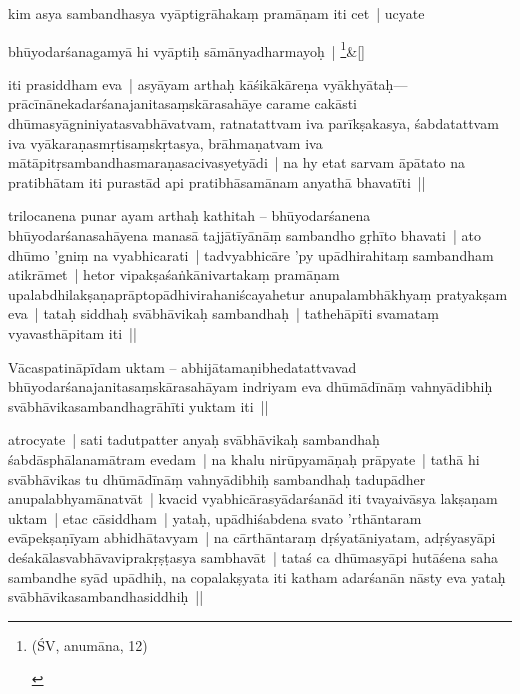 \documentclass[article,a4paper]{memoir}
\newcommand{\persName}[1]{#1}
\begin{document}
	  \pstart kim asya sambandhasya vyā\-ptigrā\-hakaṃ pramā\-ṇam iti cet | ucyate
	\pend
      
	    
	    \stanza[\smallbreak]
bhū\-yodarśanagamyā\- hi vyā\-ptiḥ sā\-mā\-nyadharmayoḥ | \footnote{\begin{english}(ŚV, anumā\-na, 12)\end{english}}\&[\smallbreak]


	

	  \pstart iti prasiddham eva | asyā\-yam arthaḥ kā\-śikā\-kā\-reṇa vyā\-khyā\-taḥ—prā\-cī\-nā\-nekadarśanajanitasaṃskā\-rasahā\-ye carame  cakā\-sti dhū\-masyā\-gniniyatasvabhā\-vatvam, ratnatattvam iva parī\-kṣakasya, śabdatattvam iva vyā\-karaṇasmṛtisaṃskṛtasya, brā\-hmaṇatvam iva mā\-tā\-pitṛsambandhasmaraṇasacivasyetyā\-di | na hy etat sarvam ā\-pā\-tato na pratibhā\-tam iti purastā\-d api pratibhā\-samā\-nam anyathā\- bhavatī\-ti ||
	\pend
      

	  \pstart \persName{trilocanena} punar ayam arthaḥ kathitah – \label{sarit__ratnakīrtinibandhāvali__125156}bhū\-yodarśanena bhū\-yodarśanasahā\-yena manasā\- tajjā\-tī\-yā\-nā\-ṃ sambandho gṛhī\-to bhavati | ato dhū\-mo 'gniṃ na vyabhicarati | tadvyabhicā\-re 'py upā\-dhirahitaṃ sambandham atikrā\-met | hetor vipakṣaśaṅkā\-nivartakaṃ pramā\-ṇam upalabdhilakṣaṇaprā\-ptopā\-dhivirahaniścayahetur anupalambhā\-khyaṃ pratyakṣam eva | tataḥ siddhaḥ svā\-bhā\-vikaḥ sambandhaḥ | tathehā\-pī\-ti svamataṃ vyavasthā\-pitam iti ||\label{sarit__ratnakīrtinibandhāvali__125583}
	\pend
      

	  \pstart Vā\-caspatinā\-pī\-dam uktam – abhijā\-tamaṇibhedatattvavad bhū\-yodarśanajanitasaṃskā\-rasahā\-yam indriyam eva dhū\-mā\-dī\-nā\-ṃ vahnyā\-dibhiḥ svā\-bhā\-vikasambandhagrā\-hī\-ti yuktam iti ||
	\pend
      

	  \pstart atrocyate |  sati tadutpatter anyaḥ svā\-bhā\-vikaḥ sambandhaḥ śabdā\-sphā\-lanamā\-tram evedam | na khalu nirū\-pyamā\-ṇaḥ prā\-pyate | tathā\- hi svā\-bhā\-vikas tu dhū\-mā\-dī\-nā\-ṃ vahnyā\-dibhiḥ sambandhaḥ tadupā\-dher anupalabhyamā\-natvā\-t | kvacid vyabhicā\-rasyā\-darśanā\-d iti tvayaivā\-sya lakṣaṇam uktam | etac cā\-siddham | yataḥ, upā\-dhiśabdena svato 'rthā\-ntaram evā\-pekṣaṇī\-yam abhidhā\-tavyam | na cā\-rthā\-ntaraṃ dṛśyatā\-niyatam, adṛśyasyā\-pi deśakā\-lasvabhā\-vaviprakṛṣṭasya sambhavā\-t | tataś ca dhū\-masyā\-pi hutā\-śena saha sambandhe syā\-d upā\-dhiḥ, na copalakṣyata iti katham adarśanā\-n nā\-sty eva yataḥ svā\-bhā\-vikasambandhasiddhiḥ ||
	\pend
      
\end{document}
